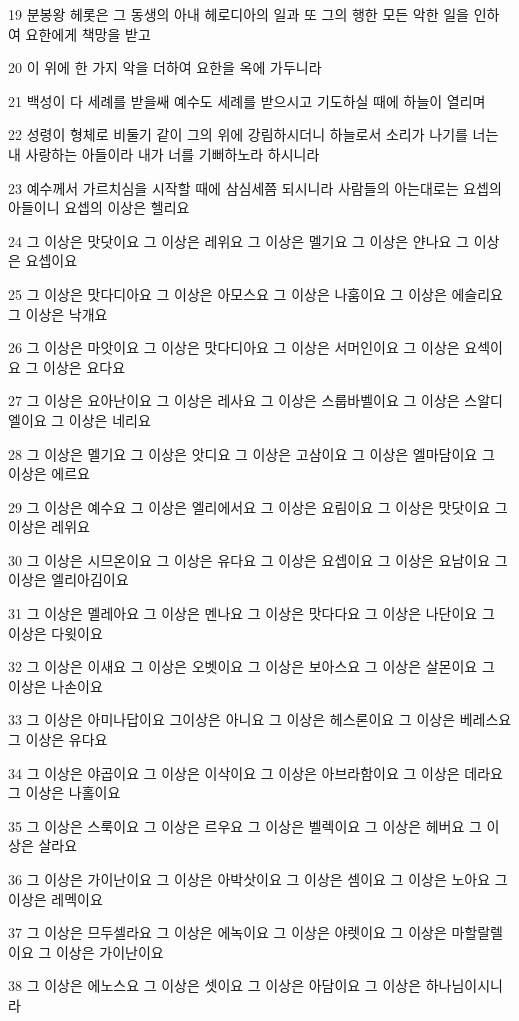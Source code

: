 \par 19 분봉왕 헤롯은 그 동생의 아내 헤로디아의 일과 또 그의 행한 모든 악한 일을 인하여 요한에게 책망을 받고
\par 20 이 위에 한 가지 악을 더하여 요한을 옥에 가두니라
\par 21 백성이 다 세례를 받을쌔 예수도 세례를 받으시고 기도하실 때에 하늘이 열리며
\par 22 성령이 형체로 비둘기 같이 그의 위에 강림하시더니 하늘로서 소리가 나기를 너는 내 사랑하는 아들이라 내가 너를 기뻐하노라 하시니라
\par 23 예수께서 가르치심을 시작할 때에 삼심세쯤 되시니라 사람들의 아는대로는 요셉의 아들이니 요셉의 이상은 헬리요
\par 24 그 이상은 맛닷이요 그 이상은 레위요 그 이상은 멜기요 그 이상은 얀나요 그 이상은 요셉이요
\par 25 그 이상은 맛다디아요 그 이상은 아모스요 그 이상은 나훔이요 그 이상은 에슬리요 그 이상은 낙개요
\par 26 그 이상은 마앗이요 그 이상은 맛다디아요 그 이상은 서머인이요 그 이상은 요섹이요 그 이상은 요다요
\par 27 그 이상은 요아난이요 그 이상은 레사요 그 이상은 스룹바벨이요 그 이상은 스알디엘이요 그 이상은 네리요
\par 28 그 이상은 멜기요 그 이상은 앗디요 그 이상은 고삼이요 그 이상은 엘마담이요 그 이상은 에르요
\par 29 그 이상은 예수요 그 이상은 엘리에서요 그 이상은 요림이요 그 이상은 맛닷이요 그 이상은 레위요
\par 30 그 이상은 시므온이요 그 이상은 유다요 그 이상은 요셉이요 그 이상은 요남이요 그 이상은 엘리아김이요
\par 31 그 이상은 멜레아요 그 이상은 멘나요 그 이상은 맛다다요 그 이상은 나단이요 그 이상은 다윗이요
\par 32 그 이상은 이새요 그 이상은 오벳이요 그 이상은 보아스요 그 이상은 살몬이요 그 이상은 나손이요
\par 33 그 이상은 아미나답이요 그이상은 아니요 그 이상은 헤스론이요 그 이상은 베레스요 그 이상은 유다요
\par 34 그 이상은 야곱이요 그 이상은 이삭이요 그 이상은 아브라함이요 그 이상은 데라요 그 이상은 나홀이요
\par 35 그 이상은 스룩이요 그 이상은 르우요 그 이상은 벨렉이요 그 이상은 헤버요 그 이상은 살라요
\par 36 그 이상은 가이난이요 그 이상은 아박삿이요 그 이상은 셈이요 그 이상은 노아요 그 이상은 레멕이요
\par 37 그 이상은 므두셀라요 그 이상은 에녹이요 그 이상은 야렛이요 그 이상은 마할랄렐이요 그 이상은 가이난이요
\par 38 그 이상은 에노스요 그 이상은 셋이요 그 이상은 아담이요 그 이상은 하나님이시니라

